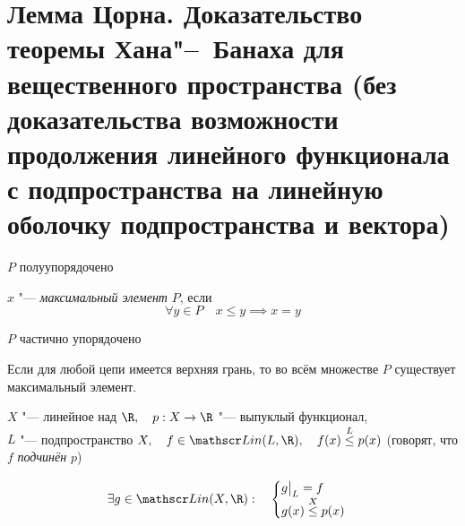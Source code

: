 \section{Лемма Цорна.
Доказательство теоремы Хана\texorpdfstring{"--~}{--}Банаха для вещественного
пространства (без доказательства возможности продолжения линейного функционала с
подпространства
на линейную оболочку подпространства и вектора)}

\begin{definition}
	$ P $ полуупорядочено

	$ x $ "--- \emph{максимальный элемент} $ P $, если
	$$ \forall y \in P \quad x \le y \implies x = y $$
\end{definition}

\begin{lemma}[Цорн]
	$ P $ частично упорядочено

	Если для любой цепи имеется верхняя грань, то во всём множестве $ P $ существует максимальный
	элемент.
\end{lemma}

\begin{theorem}
	$ X $ "--- линейное над $ \R, \quad p : X \to \R $ "--- выпуклый функционал, \\
	$ L $ "--- подпространство $ X, \quad f \in \mathscr Lin(L, \R), \quad
	f(x) \overset L \le p(x) $ (говорят, что $ f $ \emph{подчинён} $ p $)

	$$ \exists g \in \mathscr Lin(X, \R) : \quad
	\begin{cases}
		g \bigr|_L = f \\
		g(x) \overset X \le p(x)
	\end{cases} $$
\end{theorem}

